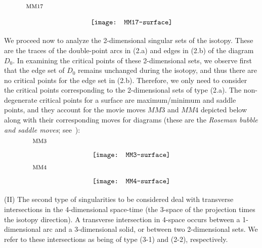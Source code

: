 \documentclass{amsart}\usepackage{amsfonts, amsmath, amssymb}\usepackage{graphicx, epic, epsf, enumerate, stmaryrd}
\theoremstyle{definition}
\numberwithin{equation}{section}
\begin{document}
\[ \raisebox{5pt}{\texttt{[image: MM17-surface]}}
\put(-207, 28){\fontsize{8}{8}$\text{MM17}$}
 \]

We proceed now to analyze the 2-dimensional singular sets of the isotopy. These are the traces of the double-point arcs in (2.a) and edges in (2.b) of the diagram $D_0$. In examining the critical points of these 2-dimensional sets, we observe first that the edge set of $D_0$ remains unchanged during the isotopy, and thus there are no critical points for the edge set in (2.b). Therefore, we only need to consider the critical points corresponding to the 2-dimensional sets of type (2.a). The non-degenerate critical points for a surface are maximum/minimum and saddle points, and they account for the movie moves $MM3$ and $MM4$ depicted below along with their corresponding moves for diagrams (these are the \textit{Roseman bubble and saddle moves}; see~\cite{CS, Ca, Ros}):
\[ \raisebox{5pt}{\texttt{[image: MM3-surface]}}
\put(-195, 25){\fontsize{8}{8}$\text{MM3}$} \]
\[ \raisebox{5pt}{\texttt{[image: MM4-surface]}}
\put(-195, 25){\fontsize{8}{8}$\text{MM4}$} \]

(II) The second type of singularities to be considered deal with transverse intersections in the 4-dimensional space-time (the 3-space of the projection times the isotopy direction). A transverse intersection in 4-space occurs between a 1-dimensional arc and a 3-dimensional solid, or between two 2-dimensional sets. We refer to these  intersections as being of type (3-1) and (2-2), respectively.
\end{document}

